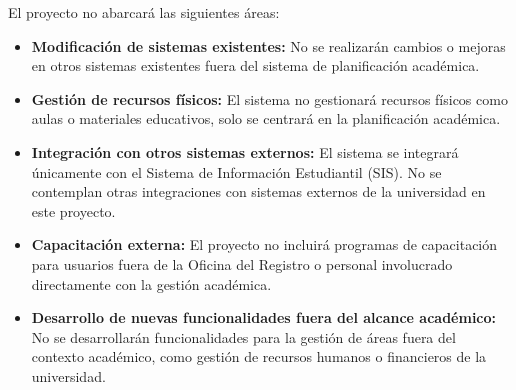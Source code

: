 El proyecto no abarcará las siguientes áreas:
\begin{itemize}
    \item \textbf{Modificación de sistemas existentes:} No se realizarán cambios o mejoras en otros sistemas existentes fuera del sistema de planificación académica.
    \item \textbf{Gestión de recursos físicos:} El sistema no gestionará recursos físicos como aulas o materiales educativos, solo se centrará en la planificación académica.
    \item \textbf{Integración con otros sistemas externos:} El sistema se integrará únicamente con el Sistema de Información Estudiantil (SIS).
No se contemplan otras integraciones con sistemas externos de la universidad en este proyecto.
    \item \textbf{Capacitación externa:} El proyecto no incluirá programas de capacitación para usuarios fuera de la Oficina del Registro o personal involucrado directamente con la gestión académica.
    \item \textbf{Desarrollo de nuevas funcionalidades fuera del alcance académico:} No se desarrollarán funcionalidades para la gestión de áreas fuera del contexto académico, como gestión de recursos humanos o financieros de la universidad.
\end{itemize}
